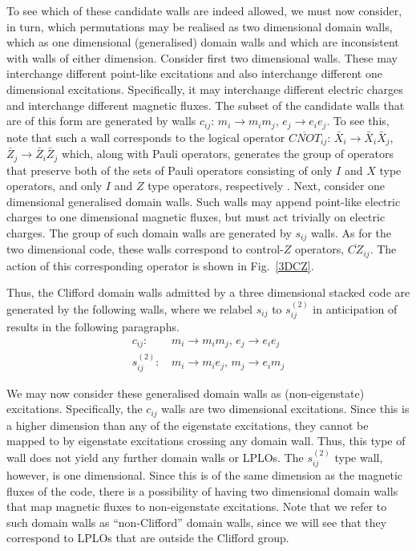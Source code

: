 \documentclass[pra,twocolumn,a4paper,nofootinbib]{revtex4-1}
\begin{document}
To see which of these candidate walls are indeed allowed, we must now consider, in turn, which permutations may be realised as two dimensional domain walls, which as one dimensional (generalised) domain walls and which are inconsistent with walls of either dimension. Consider first two dimensional walls. These may interchange different point-like excitations and also interchange different one dimensional excitations. Specifically, it may interchange different electric charges and interchange different magnetic fluxes. The subset of the candidate walls that are of this form are generated by walls $c_{ij}$: $m_i \to m_im_j$, $e_j \to e_i e_j$. To see this, note that such a wall corresponds to the logical operator $\overline{CNOT}_{ij}$: $\bar{X}_i \to \bar{X}_i \bar{X}_j$, $\bar{Z}_j \to \bar{Z}_i \bar{Z}_j$ which, along with Pauli operators, generates the group of operators that preserve both of the sets of Pauli operators consisting of only $I$ and $X$ type operators, and only $I$ and $Z$ type operators, respectively \cite{Delfosse}. Next, consider one dimensional generalised domain walls. Such walls may append point-like electric charges to one dimensional magnetic fluxes, but must act trivially on electric charges. The group of such domain walls are generated by $s_{ij}$ walls. As for the two dimensional code, these walls correspond to control-$Z$ operators, $\overline{CZ}_{ij}$. The action of this corresponding operator is shown in Fig.~\ref{3DCZ}. 

Thus, the Clifford domain walls admitted by a three dimensional stacked code are generated by the following walls, where we relabel $s_{ij}$ to $s_{ij}^{(2)}$ in anticipation of results in the following paragraphs.
\begin{align}
c_{ij}:&\, m_i \to m_im_j,\, e_j \to e_i e_j\\
s_{ij}^{(2)}:&\, m_i \to m_ie_j,\, m_j \to e_i m_j
\end{align}

We may now consider these generalised domain walls as (non-eigenstate) excitations. Specifically, the $c_{ij}$ walls are two dimensional excitations. Since this is a higher dimension than any of the eigenstate excitations, they cannot be mapped to by eigenstate excitations crossing any domain wall. Thus, this type of wall does not yield any further domain walls or LPLOs. The $s_{ij}^{(2)}$ type wall, however, is one dimensional. Since this is of the same dimension as the magnetic fluxes of the code, there is a possibility of having two dimensional domain walls that map magnetic fluxes to non-eigenstate excitations. Note that we refer to such domain walls as ``non-Clifford'' domain walls, since we will see that they correspond to LPLOs that are outside the Clifford group.
\end{document}
